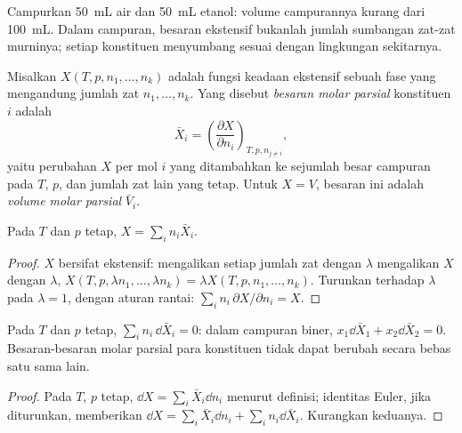 Campurkan \qty{50}{mL} air dan \qty{50}{mL} etanol: volume campurannya
kurang dari \qty{100}{mL}. Dalam campuran, besaran ekstensif bukanlah
jumlah sumbangan zat-zat murninya; setiap konstituen menyumbang sesuai
dengan lingkungan sekitarnya.

\begin{definition}\label{def:b2:chemical-potential:partial-molar}
Misalkan $X(T, p, n_1, \dots, n_k)$ adalah fungsi keadaan ekstensif sebuah
fase yang mengandung jumlah zat $n_1, \dots, n_k$. Yang disebut
\emph{besaran molar parsial} konstituen $i$
adalah
\[
  \bar X_i = \left(\frac{\partial X}{\partial n_i}\right)_{T, p, n_{j \ne i}} ,
\]
yaitu perubahan $X$ per mol $i$ yang ditambahkan ke sejumlah besar
campuran pada $T$, $p$, dan jumlah zat lain yang tetap. Untuk $X = V$,
besaran ini adalah \emph{volume molar parsial}
$\bar V_i$.
\end{definition}

\begin{theorem}\label{thm:b2:chemical-potential:euler}
Pada $T$ dan $p$ tetap, $X = \sum_i n_i\bar X_i$.
\end{theorem}

\begin{proof}
$X$ bersifat ekstensif: mengalikan setiap jumlah zat dengan $\lambda$
mengalikan $X$ dengan $\lambda$, $X(T, p, \lambda n_1, \dots, \lambda n_k) = \lambda X(T, p, n_1,
\dots, n_k)$. Turunkan terhadap $\lambda$ pada
$\lambda = 1$, dengan aturan rantai: $\sum_i n_i\,\partial X/\partial n_i = X$.
\end{proof}

\begin{proposition}\label{prop:b2:chemical-potential:gibbs-duhem}
Pada $T$ dan $p$ tetap, $\sum_i n_i\,\dd\bar X_i = 0$: dalam campuran
biner, $x_1\dd\bar X_1 + x_2\dd\bar X_2 = 0$. Besaran-besaran molar parsial
para konstituen tidak dapat berubah secara bebas satu sama lain.
\end{proposition}

\begin{proof}
Pada $T$, $p$ tetap, $\dd X = \sum_i\bar X_i\dd n_i$ menurut definisi;
identitas Euler, jika diturunkan, memberikan $\dd X = \sum_i\bar X_i\dd n_i + \sum_i
n_i\dd\bar X_i$. Kurangkan keduanya.
\end{proof}

